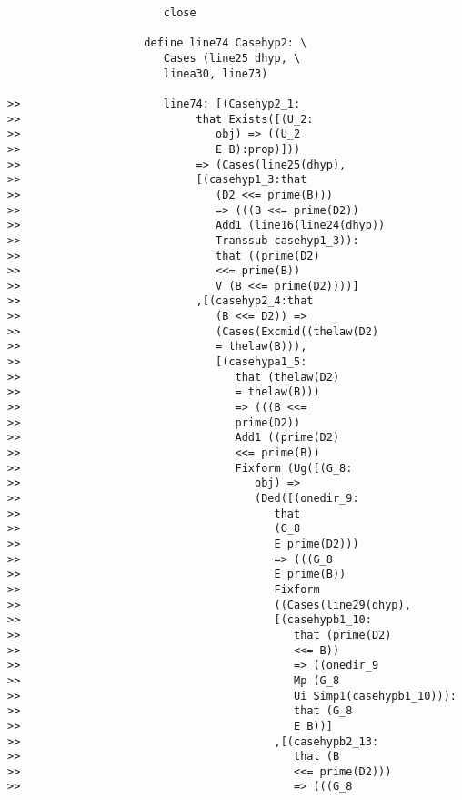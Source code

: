 \documentclass[12pt]{article}
\begin{document}
\begin{verbatim}
                        close

                     define line74 Casehyp2: \
                        Cases (line25 dhyp, \
                        linea30, line73)

>>                      line74: [(Casehyp2_1:
>>                           that Exists([(U_2:
>>                              obj) => ((U_2
>>                              E B):prop)]))
>>                           => (Cases(line25(dhyp),
>>                           [(casehyp1_3:that
>>                              (D2 <<= prime(B)))
>>                              => (((B <<= prime(D2))
>>                              Add1 (line16(line24(dhyp))
>>                              Transsub casehyp1_3)):
>>                              that ((prime(D2)
>>                              <<= prime(B))
>>                              V (B <<= prime(D2))))]
>>                           ,[(casehyp2_4:that
>>                              (B <<= D2)) =>
>>                              (Cases(Excmid((thelaw(D2)
>>                              = thelaw(B))),
>>                              [(casehypa1_5:
>>                                 that (thelaw(D2)
>>                                 = thelaw(B)))
>>                                 => (((B <<=
>>                                 prime(D2))
>>                                 Add1 ((prime(D2)
>>                                 <<= prime(B))
>>                                 Fixform (Ug([(G_8:
>>                                    obj) =>
>>                                    (Ded([(onedir_9:
>>                                       that
>>                                       (G_8
>>                                       E prime(D2)))
>>                                       => (((G_8
>>                                       E prime(B))
>>                                       Fixform
>>                                       ((Cases(line29(dhyp),
>>                                       [(casehypb1_10:
>>                                          that (prime(D2)
>>                                          <<= B))
>>                                          => ((onedir_9
>>                                          Mp (G_8
>>                                          Ui Simp1(casehypb1_10))):
>>                                          that (G_8
>>                                          E B))]
>>                                       ,[(casehypb2_13:
>>                                          that (B
>>                                          <<= prime(D2)))
>>                                          => (((G_8

\end{verbatim}
\end{document}
